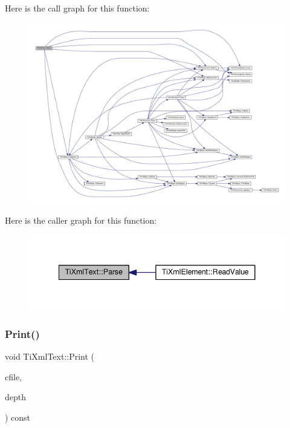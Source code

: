 Here is the call graph for this function\+:\nopagebreak
\begin{figure}[H]
\begin{center}
\leavevmode
\includegraphics[width=350pt]{class_ti_xml_text_a8d2dcfa41fc73d3e62dacc2fcf633819_cgraph}
\end{center}
\end{figure}
Here is the caller graph for this function\+:\nopagebreak
\begin{figure}[H]
\begin{center}
\leavevmode
\includegraphics[width=341pt]{class_ti_xml_text_a8d2dcfa41fc73d3e62dacc2fcf633819_icgraph}
\end{center}
\end{figure}
\mbox{\label{class_ti_xml_text_a75f6895906333894e2574cc8cf77ea79}} 
\subsubsection{\texorpdfstring{Print()}{Print()}}
{\footnotesize\ttfamily void Ti\+Xml\+Text\+::\+Print (\begin{DoxyParamCaption}\item[{F\+I\+LE $\ast$}]{cfile,  }\item[{int}]{depth }\end{DoxyParamCaption}) const\hspace{0.3cm}{\ttfamily [virtual]}}

